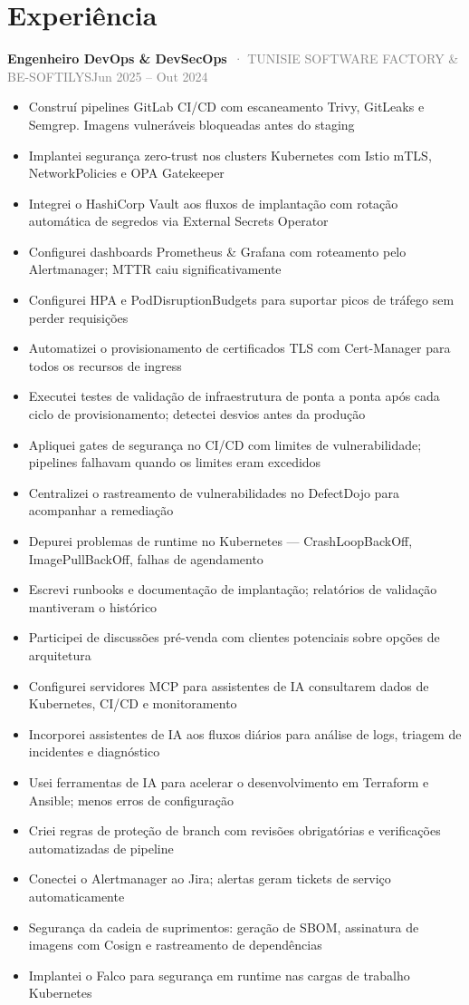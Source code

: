 \documentclass[10pt,a4paper]{article}
\newcommand{\cventry}[3]{\textbf{#1}\ \textcolor{graytext}{· #2}\hfill\textcolor{graytext}{\small #3}\par}
\begin{document}
\section*{Experiência}
\cventry{Engenheiro DevOps \& DevSecOps}{TUNISIE SOFTWARE FACTORY \& BE-SOFTILYS}{Jun 2025 – Out 2024}
\begin{itemize}
  \item Construí pipelines GitLab CI/CD com escaneamento Trivy, GitLeaks e Semgrep. Imagens vulneráveis bloqueadas antes do staging
  \item Implantei segurança zero-trust nos clusters Kubernetes com Istio mTLS, NetworkPolicies e OPA Gatekeeper
  \item Integrei o HashiCorp Vault aos fluxos de implantação com rotação automática de segredos via External Secrets Operator
  \item Configurei dashboards Prometheus \& Grafana com roteamento pelo Alertmanager; MTTR caiu significativamente
  \item Configurei HPA e PodDisruptionBudgets para suportar picos de tráfego sem perder requisições
  \item Automatizei o provisionamento de certificados TLS com Cert-Manager para todos os recursos de ingress
  \item Executei testes de validação de infraestrutura de ponta a ponta após cada ciclo de provisionamento; detectei desvios antes da produção
  \item Apliquei gates de segurança no CI/CD com limites de vulnerabilidade; pipelines falhavam quando os limites eram excedidos
  \item Centralizei o rastreamento de vulnerabilidades no DefectDojo para acompanhar a remediação
  \item Depurei problemas de runtime no Kubernetes — CrashLoopBackOff, ImagePullBackOff, falhas de agendamento
  \item Escrevi runbooks e documentação de implantação; relatórios de validação mantiveram o histórico
  \item Participei de discussões pré-venda com clientes potenciais sobre opções de arquitetura
  \item Configurei servidores MCP para assistentes de IA consultarem dados de Kubernetes, CI/CD e monitoramento
  \item Incorporei assistentes de IA aos fluxos diários para análise de logs, triagem de incidentes e diagnóstico
  \item Usei ferramentas de IA para acelerar o desenvolvimento em Terraform e Ansible; menos erros de configuração
  \item Criei regras de proteção de branch com revisões obrigatórias e verificações automatizadas de pipeline
  \item Conectei o Alertmanager ao Jira; alertas geram tickets de serviço automaticamente
  \item Segurança da cadeia de suprimentos: geração de SBOM, assinatura de imagens com Cosign e rastreamento de dependências
  \item Implantei o Falco para segurança em runtime nas cargas de trabalho Kubernetes
\end{itemize}
\end{document}
